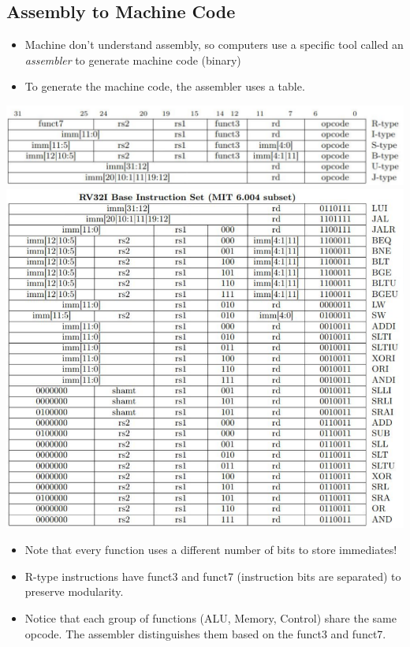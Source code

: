 \documentclass[10pt]{article}
\begin{document}
\subsection*{Assembly to Machine Code}
\begin{itemize}
    \item Machine don't understand assembly, so computers use a specific tool called an \textit{assembler} to generate machine code (binary)
    \item To generate the machine code, the assembler uses a table.
\end{itemize}
\begin{center}
    \includegraphics*[scale=0.5]{W1_9.png}\\
    \includegraphics*[scale=0.8]{W1_10.png}
\end{center}
\begin{itemize}
    \item Note that every function uses a different number of bits to store immediates!
    \item R-type instructions have funct3 and funct7 (instruction bits are separated) to preserve modularity.
    \item Notice that each group of functions (ALU, Memory, Control) share the same opcode.  The assembler distinguishes them based on the funct3 and funct7.
\end{itemize}
\end{document}
